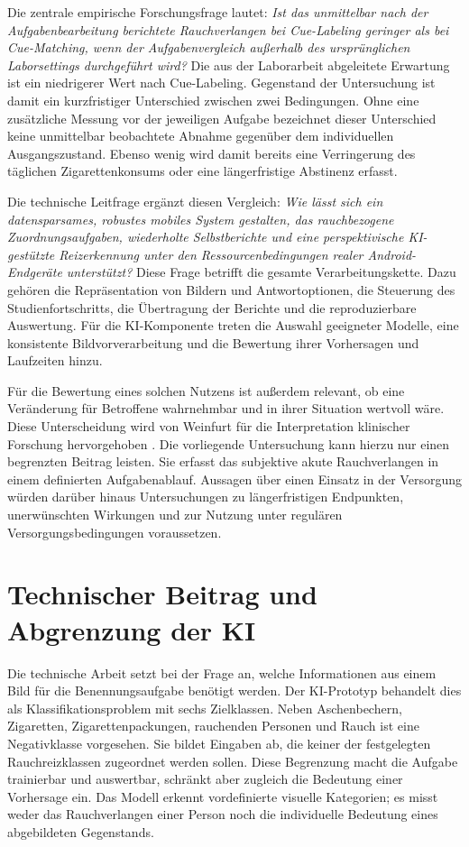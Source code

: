 Die zentrale empirische Forschungsfrage lautet: \emph{Ist das unmittelbar nach der Aufgabenbearbeitung berichtete Rauchverlangen bei Cue-Labeling geringer als bei Cue-Matching, wenn der Aufgabenvergleich außerhalb des ursprünglichen Laborsettings durchgeführt wird?} Die aus der Laborarbeit abgeleitete Erwartung ist ein niedrigerer Wert nach Cue-Labeling. Gegenstand der Untersuchung ist damit ein kurzfristiger Unterschied zwischen zwei Bedingungen. Ohne eine zusätzliche Messung vor der jeweiligen Aufgabe bezeichnet dieser Unterschied keine unmittelbar beobachtete Abnahme gegenüber dem individuellen Ausgangszustand. Ebenso wenig wird damit bereits eine Verringerung des täglichen Zigarettenkonsums oder eine längerfristige Abstinenz erfasst.

Die technische Leitfrage ergänzt diesen Vergleich: \emph{Wie lässt sich ein datensparsames, robustes mobiles System gestalten, das rauchbezogene Zuordnungsaufgaben, wiederholte Selbstberichte und eine perspektivische KI-gestützte Reizerkennung unter den Ressourcenbedingungen realer Android-Endgeräte unterstützt?} Diese Frage betrifft die gesamte Verarbeitungskette. Dazu gehören die Repräsentation von Bildern und Antwortoptionen, die Steuerung des Studienfortschritts, die Übertragung der Berichte und die reproduzierbare Auswertung. Für die KI-Komponente treten die Auswahl geeigneter Modelle, eine konsistente Bildvorverarbeitung und die Bewertung ihrer Vorhersagen und Laufzeiten hinzu.

Für die Bewertung eines solchen Nutzens ist außerdem relevant, ob eine Veränderung für Betroffene wahrnehmbar und in ihrer Situation wertvoll wäre. Diese Unterscheidung wird von Weinfurt für die Interpretation klinischer Forschung hervorgehoben \cite{weinfurt_clinically_meaningful_2019}. Die vorliegende Untersuchung kann hierzu nur einen begrenzten Beitrag leisten. Sie erfasst das subjektive akute Rauchverlangen in einem definierten Aufgabenablauf. Aussagen über einen Einsatz in der Versorgung würden darüber hinaus Untersuchungen zu längerfristigen Endpunkten, unerwünschten Wirkungen und zur Nutzung unter regulären Versorgungsbedingungen voraussetzen.

\section*{Technischer Beitrag und Abgrenzung der KI}

Die technische Arbeit setzt bei der Frage an, welche Informationen aus einem Bild für die Benennungsaufgabe benötigt werden. Der KI-Prototyp behandelt dies als Klassifikationsproblem mit sechs Zielklassen. Neben Aschenbechern, Zigaretten, Zigarettenpackungen, rauchenden Personen und Rauch ist eine Negativklasse vorgesehen. Sie bildet Eingaben ab, die keiner der festgelegten Rauchreizklassen zugeordnet werden sollen. Diese Begrenzung macht die Aufgabe trainierbar und auswertbar, schränkt aber zugleich die Bedeutung einer Vorhersage ein. Das Modell erkennt vordefinierte visuelle Kategorien; es misst weder das Rauchverlangen einer Person noch die individuelle Bedeutung eines abgebildeten Gegenstands.

